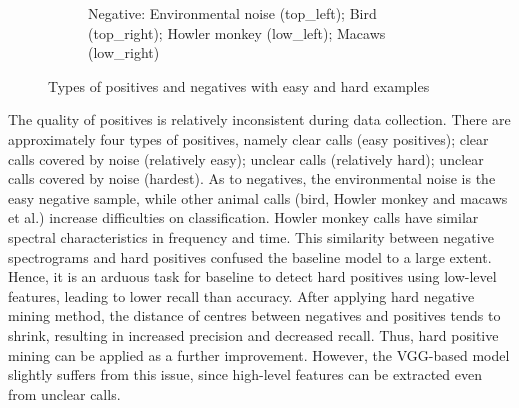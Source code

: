 \begin{figure}[!htb]
\begin{subfigure}[b]{0.5\textwidth}
          \caption{\centering Negative: Environmental noise (top\_left); Bird (top\_right); Howler monkey (low\_left); Macaws (low\_right)}
     \end{subfigure}
  \caption{Types of positives and negatives with easy and hard examples}
  \label{Fig:type}
\end{figure}
The quality of positives is relatively inconsistent during data collection. There are approximately four types of positives, namely clear calls (easy positives); clear calls covered by noise (relatively easy); unclear calls (relatively hard); unclear calls covered by noise (hardest). As to negatives, the environmental noise is the easy negative sample, while other animal calls (bird, Howler monkey and macaws et al.) increase difficulties on classification. Howler monkey calls have similar spectral characteristics in frequency and time. This similarity between negative spectrograms and hard positives confused the baseline model to a large extent. Hence, it is an arduous task for baseline to detect hard positives using low-level features, leading to lower recall than accuracy. After applying hard negative mining method, the distance of centres between negatives and positives tends to shrink, resulting in increased precision and decreased recall. Thus, hard positive mining can be applied as a further improvement. However, the VGG-based model slightly suffers from this issue, since high-level features can be extracted even from unclear calls. 


